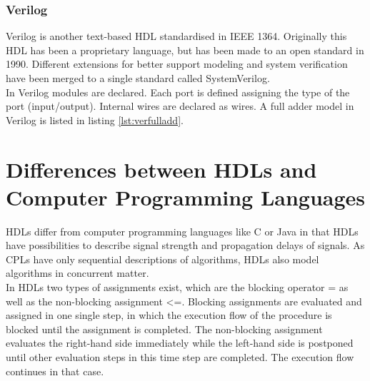 \subsubsection{Verilog}
Verilog is another text-based HDL standardised in IEEE 1364. Originally this HDL has been a proprietary language, but has been made to an open standard in 1990. Different extensions for better support modeling and system verification have been merged to a single standard called SystemVerilog.\cite{Har13}\\ In Verilog modules are declared. Each port is defined assigning the type of the port (input/output). Internal wires are declared as wires. A full adder model in Verilog is listed in listing \ref{lst:verfulladd}.

\lstset{language=Verilog, tabsize=4}
\begin{center}
\end{center}

\section{Differences between HDLs and Computer Programming Languages}
HDLs differ from computer programming languages like C or Java in that HDLs have possibilities to describe signal strength and propagation delays of signals. As CPLs have only sequential descriptions of algorithms, HDLs also model algorithms in concurrent matter.\\
In HDLs two types of assignments exist, which are the blocking operator = as well as the non-blocking assignment \textless=. Blocking assignments are evaluated and assigned in one single step, in which the execution flow of the procedure is blocked until the assignment is completed. The non-blocking assignment evaluates the right-hand side immediately while the left-hand side is postponed until other evaluation steps in this time step are completed. The execution flow continues in that case.\cite{Sut96}
